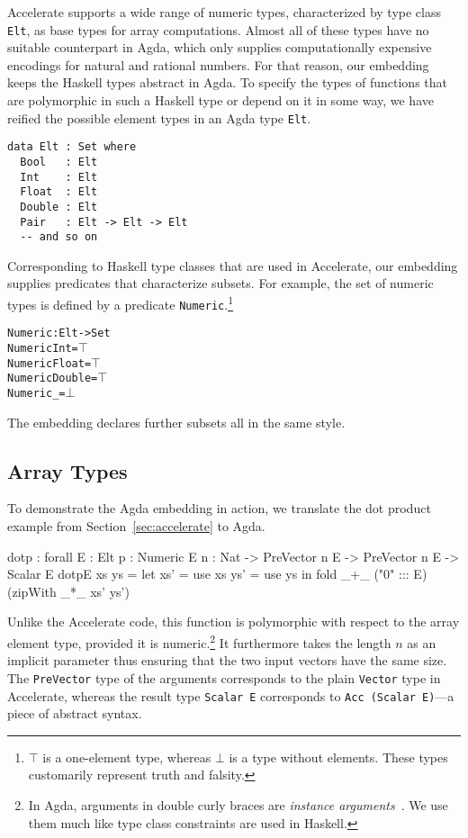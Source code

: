 \documentclass{llncs}
\begin{document}
Accelerate supports a wide range of numeric types, characterized by
type class \texttt{Elt}, as base types for
array computations. Almost all of these types have no suitable
counterpart in Agda, which only supplies  computationally expensive
encodings for natural and rational numbers. For that reason, our embedding keeps the Haskell types 
abstract in Agda. To specify the types of functions that are polymorphic in such a Haskell type or depend on it
in some way, we have reified the possible element types in an Agda type
\texttt{Elt}.
\begin{verbatim}
data Elt : Set where
  Bool   : Elt
  Int    : Elt
  Float  : Elt
  Double : Elt
  Pair   : Elt -> Elt -> Elt
  -- and so on
\end{verbatim}
Corresponding to Haskell type classes that are used in Accelerate, our
embedding supplies predicates that characterize subsets. For example,
the set of numeric types is defined by a predicate
\texttt{Numeric}.\footnote{$\top$ is a one-element type,
  whereas $\bot$ is a type without elements. These types customarily
  represent truth and falsity.}
\begin{alltt}
Numeric : Elt -> Set
Numeric Int = \(\top\)
Numeric Float = \(\top\)
Numeric Double = \(\top\)
Numeric _ = \(\bot\)
\end{alltt}
The embedding declares further subsets all in the same style.

\subsection{Array Types}
\label{sec:array-types}

To demonstrate the Agda embedding in action, we translate the
dot product example from Section~\ref{sec:accelerate} to Agda.
\begin{code}
dotp : forall {E : Elt} {{p : Numeric E}} {n : Nat}
     -> PreVector n E -> PreVector n E -> Scalar E
dotp{E} xs ys = 
  let xs' = use xs
      ys' = use ys
  in  fold _+_ ("0" ::: E) (zipWith _*_ xs' ys')
\end{code}
Unlike the Accelerate code, this function is polymorphic with respect
to the array element type, provided it is numeric.\footnote{In Agda, arguments in double curly braces are \emph{instance arguments}~\cite{DevriesePiessens2011}. We use them much like type class constraints are used in Haskell.} It furthermore
takes the length $n$ as an implicit parameter thus ensuring that the two input
vectors have the same size. The \texttt{PreVector} type of the
arguments corresponds to the plain \texttt{Vector} type in Accelerate,
whereas the result type \texttt{Scalar E} corresponds to \texttt{Acc
  (Scalar E)}---a piece of abstract syntax. 
\end{document}
